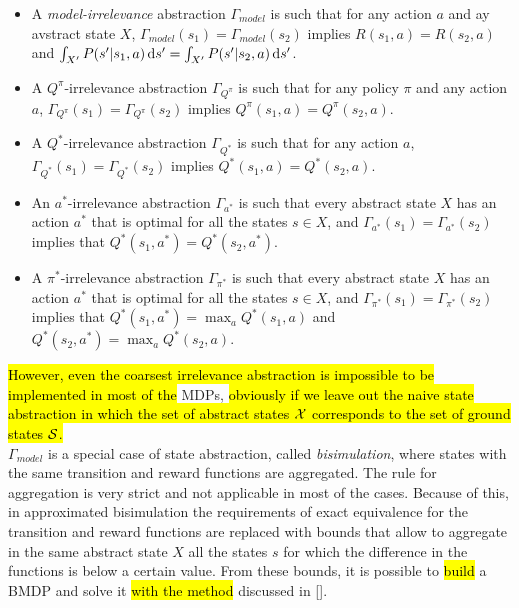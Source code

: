 \begin{itemize}
	\item A \emph{model-irrelevance} abstraction $\Gamma_{model}$ is such that for any action $a$ and ay avstract state $X$, $\Gamma_{model}(s_1) = \Gamma_{model}(s_2)$ implies $R(s_1,a)=R(s_2,a)$ and $\int_{X'}P(s'|s_1,a) \,\mathrm{d} s'= \int_{X'}P(s'|s_2,a) \,\mathrm{d} s'$.
	\item A $Q^{\pi}$-irrelevance abstraction $\Gamma_{Q^{\pi}}$ is such that for any policy $\pi$ and any action $a$, $\Gamma_{Q^{\pi}}(s_1) = \Gamma_{Q^{\pi}}(s_2)$ implies $Q^{\pi}(s_1,a)=Q^{\pi}(s_2,a)$.
	\item A $Q^{*}$-irrelevance abstraction $\Gamma_{Q^{*}}$ is such that for any action $a$, $\Gamma_{Q^{*}}(s_1) = \Gamma_{Q^{*}}(s_2)$ implies $Q^{*}(s_1,a)=Q^{*}(s_2,a)$.
	\item An $a^{*}$-irrelevance abstraction $\Gamma_{a^{*}}$ is such that every abstract state $X$ has an action $a^{*}$ that is optimal for all the states $s \in X$, and $\Gamma_{a^{*}}(s_1) = \Gamma_{a^{*}}(s_2)$ implies that $Q^{*}(s_1,a^{*})=Q^{*}(s_2,a^{*})$.
	\item A $\pi^{*}$-irrelevance abstraction $\Gamma_{\pi^{*}}$ is such that every abstract state $X$ has an action $a^{*}$ that is optimal for all the states $s \in X$, and $\Gamma_{\pi^{*}}(s_1) = \Gamma_{\pi^{*}}(s_2)$ implies that $Q^{*}(s_1,a^{*})=\max_{a}Q^{*}(s_1,a)$ and $Q^{*}(s_2,a^{*})=\max_{a}Q^{*}(s_2,a)$.
\end{itemize}
\noindent \hl{However, even the coarsest irrelevance abstraction is impossible to be implemented in most of the} \ac{MDPs}, \hl{obviously if we leave out the naive state abstraction in which the set of abstract states $\mathcal{X}$ corresponds to the set of ground states $\mathcal{S}$.}\\
\newline
$\Gamma_{model}$ is a special case of state abstraction, called \emph{bisimulation}, where states with the same transition and reward functions are aggregated. The rule for aggregation is very strict and not applicable in most of the cases. Because of this, in approximated bisimulation the requirements of exact equivalence for the transition and reward functions are replaced with bounds that allow to aggregate in the same abstract state $X$ all the states $s$ for which the difference in the functions is below a certain value. From these bounds, it is possible to \hl{build} a \ac{BMDP} and solve it \hl{with the method} discussed in  [\cite{dean2013model}].\\
